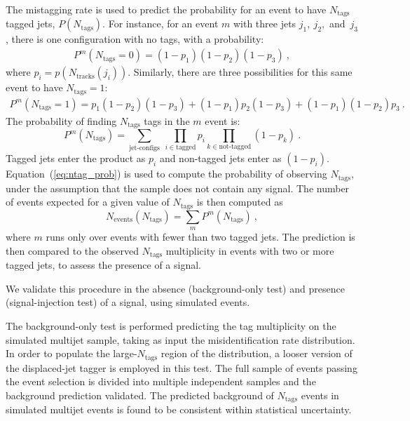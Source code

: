 The mistagging rate is used to predict the probability for an event to
have $N_\text{tags}$ tagged jets, $P(N_{\textrm{tags}})$. For instance, for an event $m$
with three jets $j_1, ~j_2$,~and~$ j_3$, there is one configuration with no tags,
with a probability:
\begin{align*} 
P^m(N_{\textrm{tags}}=0) = (1-p_1)(1-p_2)(1-p_3)~,
\end{align*} 
where $p_i = p(N_{\textrm{tracks}}(j_i))$.  Similarly, there are three
possibilities for this same event to have $N_{\textrm{tags}}=1$:
\begin{align*}
P^m(N_{\textrm{tags}}=1) = p_1(1-p_2)(1-p_3)
+  (1-p_1)p_2(1-p_3)
+  (1-p_1)(1-p_2)p_3~.
\end{align*}
The probability of finding $N_{\textrm{tags}}$  tags in the $m$ event is:
\begin{equation}
P^m(N_{\textrm{tags}}) = \sum_{\textrm{jet-configs}}~\prod_{i\in
  \textrm{tagged}} p_i \prod_{k \in \textrm{not-tagged}} (1-p_k)~.
\label{eq:ntag_prob}
\end{equation}
Tagged jets enter the product as $p_i$ and non-tagged jets enter as
$(1-p_i)$. Equation~(\ref{eq:ntag_prob}) is used to compute the
probability of observing $N_{\textrm{tags}}$, under the assumption
that the sample does not contain any signal. The number of events
expected for a given value of $N_{\textrm{tags}}$ is then computed as
\begin{equation}
N_{\textrm{events}}(N_{\textrm{tags}}) = \sum_{m} P^m(N_{\textrm{tags}})~,
\end{equation}
where $m$ runs only over events with fewer than two tagged jets.  The prediction is then compared
to the observed $N_{\textrm{tags}}$ multiplicity in events with two or
more tagged jets, to assess the presence of a signal. 

We validate this procedure in the absence (background-only test) and
presence (signal-injection test) of a signal, using simulated events.

The background-only test is performed predicting the tag multiplicity
on the simulated multijet sample, taking as input the misidentification rate
distribution. In order to populate the large-$N_{\textrm{tags}}$
region of the distribution, a looser version of the displaced-jet
tagger is employed in this test. The full sample of events passing the
event selection is divided into multiple independent samples and the background
prediction validated. The predicted background of $N_{\textrm{tags}}$ events
in simulated multijet events is found to be consistent within statistical uncertainty. 

